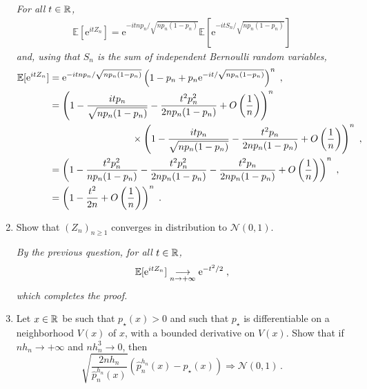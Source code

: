 \begin{enumerate}
\vspace{.2cm}

{\em
For all $t\in\mathbb{R}$,
\begin{align*}
\mathbb{E}[\mathrm{e}^{itZ_n}] = \mathrm{e}^{-itnp_n/\sqrt{np_n(1-p_n)}}\mathbb{E}\left[\mathrm{e}^{-itS_n/\sqrt{np_n(1-p_n)}}\right]
\end{align*}
and, using that $S_n$ is the sum of independent Bernoulli random variables,
\begin{align*}
\mathbb{E}[\mathrm{e}^{itZ_n}] &= \mathrm{e}^{-itnp_n/\sqrt{np_n(1-p_n)}}\left(1-p_n + p_n\mathrm{e}^{-it/\sqrt{np_n(1-p_n)}}\right)^n\eqsp,\\
&= \left(1 - \frac{itp_n}{\sqrt{np_n(1-p_n)}} - \frac{t^2p^2_n}{2np_n(1-p_n)} +  O\left(\frac{1}{n}\right)\right)^n\\
&\hspace{3cm}\times \left(1- \frac{itp_n}{\sqrt{np_n(1-p_n)}} - \frac{t^2p_n}{2np_n(1-p_n)}  + O\left(\frac{1}{n}\right)\right)^n\eqsp,\\
&=\left(1 - \frac{t^2p^2_n}{np_n(1-p_n)} - \frac{t^2p^2_n}{2np_n(1-p_n)} - \frac{t^2p_n}{2np_n(1-p_n)} +  O\left(\frac{1}{n}\right)\right)^n\eqsp,\\
&=\left(1 - \frac{t^2}{2n} + O\left(\frac{1}{n}\right)\right)^n\eqsp.
\end{align*}
}
\item Show that $(Z_n)_{n\geqslant 1}$ converges in distribution to $\mathcal{N}(0,1)$.

\vspace{.2cm}

{\em
By the previous question, for all $t\in\mathbb{R}$,
$$
\mathbb{E}[\mathrm{e}^{itZ_n}] \underset{n\to +\infty}{\longrightarrow} \mathrm{e}^{-t^2/2}\;,
$$ 
which completes the proof.
}
\item Let $x\in\mathbb{R}$ be such that $p_{\star}(x)>0$ and such that $p_{\star}$ is differentiable on a neighborhood $V(x)$ of $x$, with a bounded derivative on $V(x)$. Show that if $n h_n \to +\infty$ and $n h_n^3\to 0$, then
\[
\sqrt{\frac{2nh_n}{\widehat{p}^{h_n}_n(x)}}\left(\widehat{p}^{h_n}_n(x)-p_{\star}(x)\right)\Rightarrow \mathcal{N}(0,1)\,.
\] 

\vspace{.2cm}


\end{enumerate}

